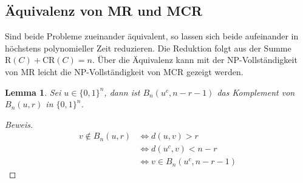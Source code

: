 \documentclass[11pt]{article}
\newtheorem{lemma}{Lemma}
\theoremstyle{break}
\theoremstyle{norm}
\begin{document}
\subsection{Äquivalenz von MR und MCR}
Sind beide Probleme zueinander äquivalent, so lassen sich beide aufeinander in höchstens polynomieller Zeit reduzieren.
 Die Reduktion folgt aus der Summe $\text{R}(C) + \text{CR}(C) = n$. Über die Äquivalenz kann mit der NP-Vollständigkeit von MR leicht die NP-Vollständigkeit von MCR gezeigt werden.
\begin{lemma}
 Sei $u\in \{0,1\}^n$, dann ist $B_n(u^c, n-r-1)$ das Komplement von $B_n(u,r)$ in $\{0,1\}^n$.
\end{lemma} 
\begin{proof}[Beweis]
\begin{align*}
v \not \in B_n(u,r) &\Leftrightarrow d(u,v) > r\\
&\Leftrightarrow d(u^c,v) < n-r\\
&\Leftrightarrow v \in B_n(u^c, n-r-1)
\end{align*} 
\end{proof}
\end{document}
